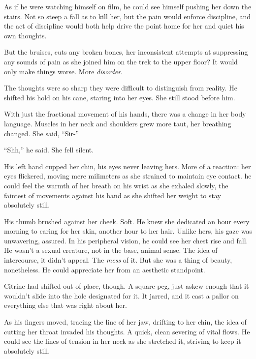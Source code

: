 As if he were watching himself on film, he could see himself pushing her down the stairs.  Not so steep a fall as to kill her, but the pain would enforce discipline, and the act of discipline would both help drive the point home for her and quiet his own thoughts.



But the bruises, cuts any broken bones, her inconsistent attempts at suppressing any sounds of pain as she joined him on the trek to the upper floor?  It would only make things worse.  More \emph{disorder}.



The thoughts were so sharp they were difficult to distinguish from reality.  He shifted his hold on his cane, staring into her eyes.  She still stood before him.



With just the fractional movement of his hands, there was a change in her body language.  Muscles in her neck and shoulders grew more taut, her breathing changed.  She said, ``Sir-''



``Shh,'' he said.  She fell silent.



His left hand cupped her chin, his eyes never leaving hers.  More of a reaction: her eyes flickered, moving mere milimeters as she strained to maintain eye contact.  he could feel the warmth of her breath on his wrist as she exhaled slowly, the faintest of movements against his hand as she shifted her weight to stay absolutely still.



His thumb brushed against her cheek.  Soft.  He knew she dedicated an hour every morning to caring for her skin, another hour to her hair.  Unlike hers, his gaze was unwavering, assured.  In his peripheral vision, he could see her chest rise and fall.  He wasn't a sexual creature, not in the base, animal sense.  The idea of intercourse, it didn't appeal.  The \emph{mess} of it.  But she was a thing of beauty, nonetheless.  He could appreciate her from an aesthetic standpoint.



Citrine had shifted out of place, though.  A square peg, just askew enough that it wouldn't slide into the hole designated for it.  It jarred, and it cast a pallor on everything else that was right about her.



As his fingers moved, tracing the line of her jaw, drifting to her chin, the idea of cutting her throat invaded his thoughts.  A quick, clean severing of vital flows.  He could see the lines of tension in her neck as she stretched it, striving to keep it absolutely still.



